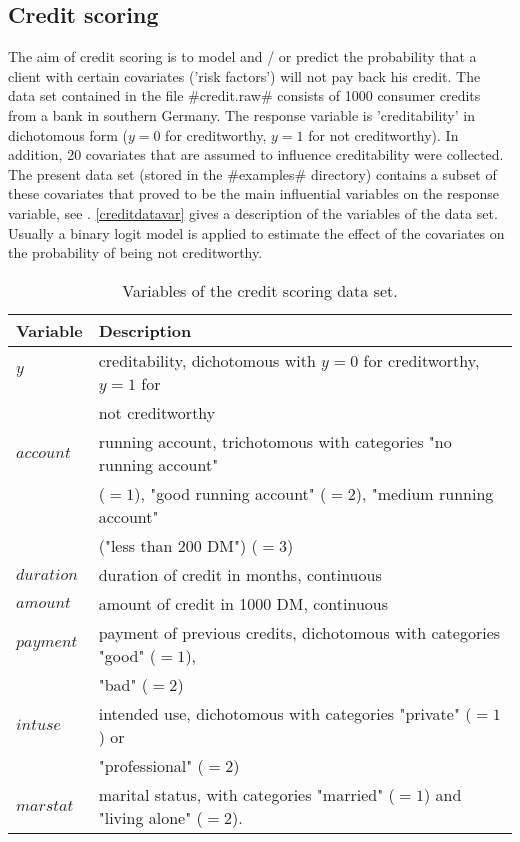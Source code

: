 \subsection{Credit scoring}
 \label{creditdata} 

The aim of credit scoring is to model and / or predict the probability that a client with certain covariates ('risk factors') will not pay back his credit. The data set contained in the file #credit.raw# consists of 1000 consumer credits from a bank in southern Germany. The response variable is 'creditability' in dichotomous form ($y=0$ for creditworthy, $y=1$ for not creditworthy). In addition, 20 covariates that are assumed to influence creditability were collected. The present data set (stored in the #examples# directory) contains a subset of these covariates that proved to be the  main influential variables on the response variable, see . \autoref{creditdatavar} gives a description of the variables of the data set. Usually a binary logit model is applied to estimate the effect of the covariates on the probability of being not creditworthy. 

\begin{table}[ht]

\begin{tabular}{|l|l|}
\hline
{\bf Variable} & {\bf Description} \\
\hline
$y$ & creditability, dichotomous with $y=0$ for creditworthy, $y=1$ for \\
    & not creditworthy \\
$account$ & running account, trichotomous with categories "no
running account" \\& ($=1$),
    "good running account"
($=2$),  "medium running account" \\&("less than 200 DM") ($=3$)  \\
$duration$ & duration of credit in months, continuous \\
$amount$ & amount of credit in 1000 DM, continuous \\
$payment$ & payment of previous credits, dichotomous with categories "good" ($=1$), \\ & "bad" ($=2$)  \\
$intuse$ & intended use, dichotomous with categories "private" ($=1$) or \\ & "professional" ($=2$)  \\
$marstat$ & marital status, with categories "married" ($=1$) and "living alone" ($=2$). \\
\hline
\end{tabular}
{\em \caption{\label{creditdatavar}Variables of the credit scoring
data set.}}
\end{table}

